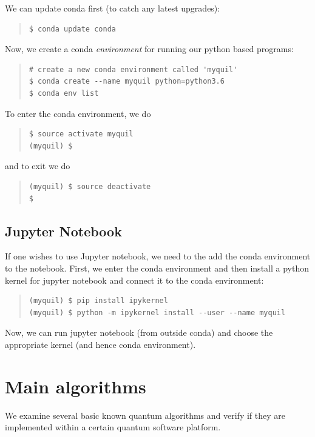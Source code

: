 \documentclass[a4paper,10pt]{article}
\begin{document}
We can update conda first (to catch any latest upgrades):
\begin{quote}
\begin{verbatim}
$ conda update conda
\end{verbatim}
\end{quote}

Now, we create a conda {\em environment} for running our python based programs:
\begin{quote}
\begin{verbatim}
# create a new conda environment called 'myquil'
$ conda create --name myquil python=python3.6
$ conda env list
\end{verbatim}
\end{quote}
To enter the conda environment, we do
\begin{quote}
\begin{verbatim} 
$ source activate myquil
(myquil) $
\end{verbatim}
\end{quote}
and to exit we do
\begin{quote}
\begin{verbatim} 
(myquil) $ source deactivate
$
\end{verbatim}
\end{quote}

\subsection{Jupyter Notebook}

If one wishes to use Jupyter notebook, we need to the add the conda environment
to the notebook. First, we enter the conda environment and then install a python kernel 
for jupyter notebook and connect it to the conda environment:
\begin{quote}
\begin{verbatim} 
(myquil) $ pip install ipykernel
(myquil) $ python -m ipykernel install --user --name myquil
\end{verbatim}
\end{quote}
Now, we can run jupyter notebook (from outside conda) and choose the appropriate 
kernel (and hence conda environment).


\section{Main algorithms}

We examine several basic known quantum algorithms and verify if they are implemented 
within a certain quantum software platform.
\end{document}

